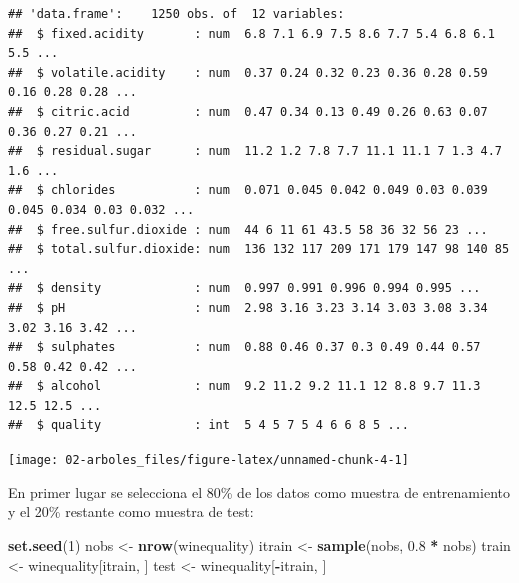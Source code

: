 \documentclass[]{book}
\newenvironment{Shaded}{\begin{snugshade}}{\end{snugshade}}
\newcommand{\KeywordTok}[1]{\textcolor[rgb]{0.13,0.29,0.53}{\textbf{#1}}}
\newcommand{\DecValTok}[1]{\textcolor[rgb]{0.00,0.00,0.81}{#1}}
\newcommand{\FloatTok}[1]{\textcolor[rgb]{0.00,0.00,0.81}{#1}}
\newcommand{\StringTok}[1]{\textcolor[rgb]{0.31,0.60,0.02}{#1}}
\newcommand{\OperatorTok}[1]{\textcolor[rgb]{0.81,0.36,0.00}{\textbf{#1}}}
\newcommand{\NormalTok}[1]{#1}
\theoremstyle{break}
\theoremstyle{definition}
\theoremstyle{definition}
\theoremstyle{definition}
\theoremstyle{remark}
\begin{document}
\begin{verbatim}
## 'data.frame':    1250 obs. of  12 variables:
##  $ fixed.acidity       : num  6.8 7.1 6.9 7.5 8.6 7.7 5.4 6.8 6.1 5.5 ...
##  $ volatile.acidity    : num  0.37 0.24 0.32 0.23 0.36 0.28 0.59 0.16 0.28 0.28 ...
##  $ citric.acid         : num  0.47 0.34 0.13 0.49 0.26 0.63 0.07 0.36 0.27 0.21 ...
##  $ residual.sugar      : num  11.2 1.2 7.8 7.7 11.1 11.1 7 1.3 4.7 1.6 ...
##  $ chlorides           : num  0.071 0.045 0.042 0.049 0.03 0.039 0.045 0.034 0.03 0.032 ...
##  $ free.sulfur.dioxide : num  44 6 11 61 43.5 58 36 32 56 23 ...
##  $ total.sulfur.dioxide: num  136 132 117 209 171 179 147 98 140 85 ...
##  $ density             : num  0.997 0.991 0.996 0.994 0.995 ...
##  $ pH                  : num  2.98 3.16 3.23 3.14 3.03 3.08 3.34 3.02 3.16 3.42 ...
##  $ sulphates           : num  0.88 0.46 0.37 0.3 0.49 0.44 0.57 0.58 0.42 0.42 ...
##  $ alcohol             : num  9.2 11.2 9.2 11.1 12 8.8 9.7 11.3 12.5 12.5 ...
##  $ quality             : int  5 4 5 7 5 4 6 6 8 5 ...
\end{verbatim}

\begin{Shaded}
\end{Shaded}

\begin{center}\texttt{[image: 02-arboles\_files/figure-latex/unnamed-chunk-4-1]} \end{center}

En primer lugar se selecciona el 80\% de los datos como muestra de
entrenamiento y el 20\% restante como muestra de test:

\begin{Shaded}
\begin{Highlighting}[]
\KeywordTok{set.seed}\NormalTok{(}\DecValTok{1}\NormalTok{)}
\NormalTok{nobs <-}\StringTok{ }\KeywordTok{nrow}\NormalTok{(winequality)}
\NormalTok{itrain <-}\StringTok{ }\KeywordTok{sample}\NormalTok{(nobs, }\FloatTok{0.8} \OperatorTok{*}\StringTok{ }\NormalTok{nobs)}
\NormalTok{train <-}\StringTok{ }\NormalTok{winequality[itrain, ]}
\NormalTok{test <-}\StringTok{ }\NormalTok{winequality[}\OperatorTok{-}\NormalTok{itrain, ]}
\end{Highlighting}
\end{Shaded}
\end{document}
